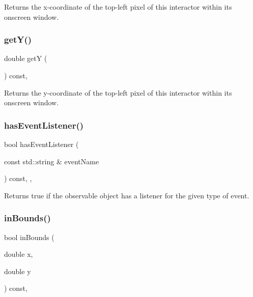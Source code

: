 Returns the x-\/coordinate of the top-\/left pixel of this interactor within its onscreen window. 

\mbox{\label{classsgl_1_1GInteractor_aafa51c7f8f38a09febbb9ce7853f77b4}} 
\subsubsection{\texorpdfstring{get\+Y()}{getY()}}
{\footnotesize\ttfamily double getY (\begin{DoxyParamCaption}{ }\end{DoxyParamCaption}) const\hspace{0.3cm}{\ttfamily [virtual]}, {\ttfamily [inherited]}}



Returns the y-\/coordinate of the top-\/left pixel of this interactor within its onscreen window. 

\mbox{\label{classsgl_1_1GObservable_a9f6faaa25942923bafa1c44020c49fa9}} 
\subsubsection{\texorpdfstring{has\+Event\+Listener()}{hasEventListener()}}
{\footnotesize\ttfamily bool has\+Event\+Listener (\begin{DoxyParamCaption}\item[{const std\+::string \&}]{event\+Name }\end{DoxyParamCaption}) const\hspace{0.3cm}{\ttfamily [protected]}, {\ttfamily [virtual]}, {\ttfamily [inherited]}}



Returns true if the observable object has a listener for the given type of event. 

\mbox{\label{classsgl_1_1GInteractor_afc480f652b8c5f1fb255e2269ce68879}} 
\subsubsection{\texorpdfstring{in\+Bounds()}{inBounds()}\hspace{0.1cm}{\footnotesize\ttfamily [1/2]}}
{\footnotesize\ttfamily bool in\+Bounds (\begin{DoxyParamCaption}\item[{double}]{x,  }\item[{double}]{y }\end{DoxyParamCaption}) const\hspace{0.3cm}{\ttfamily [virtual]}, {\ttfamily [inherited]}}



